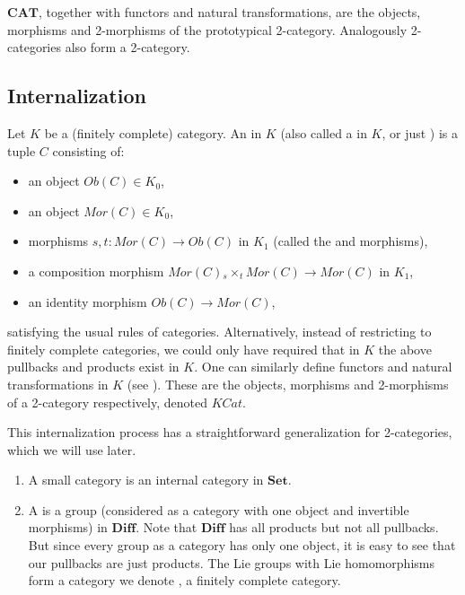 \begin{example}
$\mathbf{CAT}$, together with functors and natural transformations, are the objects, morphisms and 2-morphisms of the prototypical 2-category. Analogously 2-categories also form a 2-category.
\end{example}

\subsection{Internalization}

\begin{definition}
 Let $K$ be a (finitely complete) category. An  in $K$ (also called a  in $K$, or just ) is a tuple $C$ consisting of:
\begin{itemize}
 \item an object $Ob(C)\in K_0$,
\item an object $Mor(C)\in K_0$,
\item morphisms $s,t:Mor(C)\rightarrow Ob(C)$  in $K_1$ (called the  and  morphisms),
\item a composition morphism $Mor(C) {{}_s\times_t} Mor(C)\rightarrow Mor(C)$ in $K_1$,
\item an identity morphism $Ob(C)\rightarrow Mor(C)$,
\end{itemize}
satisfying the usual rules of categories. Alternatively, instead of restricting to finitely complete categories, we could only have required that in $K$ the above pullbacks and products exist in $K$. One can similarly define functors and natural transformations in $K$ (see \cite{ehresmann}). These are the objects, morphisms and 2-morphisms of a 2-category respectively, denoted $KCat$.
\end{definition}

This internalization process has a straightforward generalization for 2-categories, which we will use later. 

\begin{example}\label{diffp}
 \begin{enumerate}
  \item A small category is an internal category in $\mathbf{Set}$.
\item A  is a group (considered as a category with one object and invertible morphisms) in $\mathbf{Diff}$.  Note that $\mathbf{Diff}$ has all products but not all pullbacks. But since every group as a category has only one object, it is easy to see that our pullbacks are just products. The Lie groups with Lie homomorphisms form a category we denote , a finitely complete category.
\end{enumerate}
\end{example}

